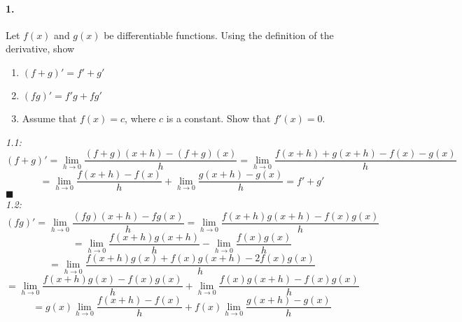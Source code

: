\documentclass[10pt,a4paper]{article}
\begin{document}
\paragraph{1.} Let $f(x)$ and $g(x)$ be differentiable functions. Using the definition of the derivative, show 
\begin{enumerate}
\item $(f+g)' = f'+g'$
\item $(fg)' = f'g + fg'$
\item Assume that $f(x) = c$, where $c$ is a constant. Show that $f'(x) = 0$.
\end{enumerate}
\begin{flushleft}
\textit{1.1:}\\
$$(f+g)'  =  \lim_{h \to 0} \frac{(f+g)(x+h)-(f+g)(x)}{h} = \lim_{h \to 0} \frac{f(x+h)+g(x+h)-f(x)-g(x)}{h}$$
$$ = \lim_{h \to 0} \frac{f(x+h)-f(x)}{h}+ \lim_{h \to 0} \frac{g(x+h)-g(x)}{h} = f'+g'$$
$\blacksquare$\\
\textit{1.2:}\\
$$ (fg)' = \lim_{h \to 0} \frac{(fg)(x+h) - fg(x)}{h} = \lim_{h \to 0} \frac{f(x+h)g(x+h) - f(x)g(x)}{h}$$
$$ = \lim_{h \to 0} \frac{f(x+h)g(x+h)}{h} - \lim_{h \to 0} \frac{f(x)g(x)}{h}$$
$$= \lim_{h \to 0} \frac{f(x+h)g(x)+f(x)g(x+h) - 2f(x)g(x)}{h} $$
$$= \lim_{h \to 0} \frac{f(x+h)g(x) - f(x)g(x)}{h} + \lim_{h \to 0} \frac{f(x)g(x+h)-f(x)g(x)}{h}$$
$$= g(x)\lim_{h \to 0} \frac{f(x+h) - f(x)}{h} + f(x)\lim_{h \to 0} \frac{g(x+h)-g(x)}{h}$$
\end{flushleft}
\end{document}
